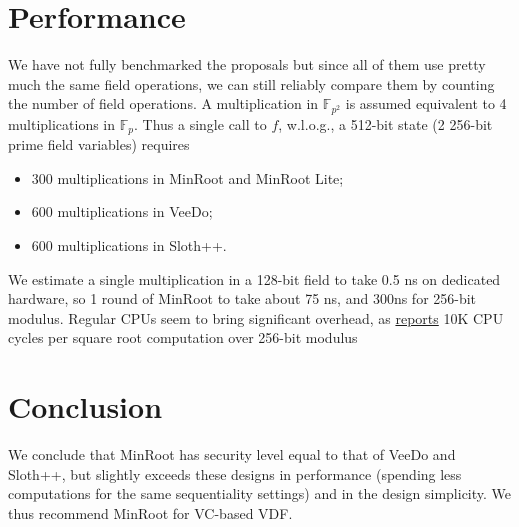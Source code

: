 \documentclass{article}
\begin{document}
\section{Performance}

We have not fully benchmarked the proposals but since all of them use pretty much the same field operations, we can still reliably compare them by counting the number of field operations. A multiplication in $\mathbb{F}_{p^2}$ is assumed equivalent to 4 multiplications in $\mathbb{F}_p$. Thus a single call to $f$, w.l.o.g., a 512-bit state (2 256-bit prime field variables) requires 
\begin{itemize}
    \item 300 multiplications in MinRoot and MinRoot Lite;
    \item  600 multiplications in VeeDo;
    \item 600 multiplications in Sloth++.
\end{itemize}

We estimate a single multiplication in a 128-bit field to take 0.5 ns on dedicated hardware, so 1 round of MinRoot to take about 75 ns, and 300ns for 256-bit modulus. Regular CPUs seem to bring significant overhead, as
\href{http://stevengoldfeder.com/papers/BGB17-IEEESB-proof_of_delay_ethereum.pdf}{reports} 10K CPU cycles per square root computation over 256-bit modulus

\section{Conclusion}

We conclude that MinRoot has security level equal to that of VeeDo and Sloth++, but slightly exceeds these designs in performance (spending less computations for the same sequentiality settings) and in the design simplicity. We thus recommend MinRoot for VC-based VDF. 



\end{document}
